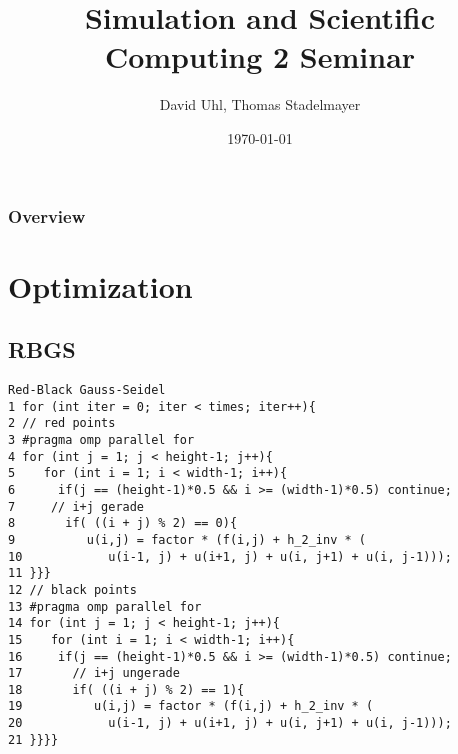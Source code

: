\documentclass{beamer}
\title[Short title]{Simulation and Scientific Computing 2 \newline Seminar} %
\author{David Uhl, Thomas Stadelmayer} %
\institute[FAU] %
{
Friedrich Alexander Universit\"at Erlangen N\"urnberg \\ %
\medskip
}
\date{\today} %
\begin{document}
\begin{frame}
\titlepage %
\end{frame}

\begin{frame}
\frametitle{Overview} %
\tableofcontents %
\end{frame}


\section{Optimization} %

\subsection{RBGS} %


 \begin{lstlisting}
Red-Black Gauss-Seidel
1 for (int iter = 0; iter < times; iter++){
2 // red points
3 #pragma omp parallel for
4 for (int j = 1; j < height-1; j++){
5    for (int i = 1; i < width-1; i++){
6      if(j == (height-1)*0.5 && i >= (width-1)*0.5) continue;
7 	  // i+j gerade
8       if( ((i + j) % 2) == 0){
9          u(i,j) = factor * (f(i,j) + h_2_inv * ( 
10            u(i-1, j) + u(i+1, j) + u(i, j+1) + u(i, j-1)));
11 }}}
12 // black points
13 #pragma omp parallel for
14 for (int j = 1; j < height-1; j++){
15    for (int i = 1; i < width-1; i++){
16     if(j == (height-1)*0.5 && i >= (width-1)*0.5) continue;
17       // i+j ungerade
18       if( ((i + j) % 2) == 1){
19          u(i,j) = factor * (f(i,j) + h_2_inv * ( 
20            u(i-1, j) + u(i+1, j) + u(i, j+1) + u(i, j-1)));
21 }}}}


\end{lstlisting}
\end{document}
